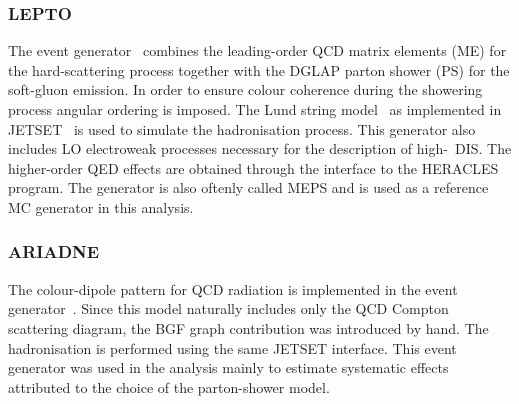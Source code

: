 \subsubsection{LEPTO}
The \lepto event generator~\cite{lepto} combines the leading-order QCD matrix elements (ME) for the hard-scattering process together with the DGLAP parton shower (PS) for the soft-gluon emission. In order to ensure colour coherence during the showering process angular ordering is imposed. The Lund string model~\cite{lund} as implemented in JETSET~\cite{jetset} is used to simulate the hadronisation process. This generator also includes LO electroweak processes necessary for the description of high-\qsq~DIS. The higher-order QED effects are obtained through the interface to the HERACLES~\cite{heracles} program. The \lepto generator is also oftenly called MEPS and is used as a reference MC generator in this analysis.
\subsubsection{ARIADNE}
The colour-dipole pattern for QCD radiation is implemented in the \ariadne event generator~\cite{ariadne}. Since this model naturally includes only the QCD Compton scattering diagram, the BGF graph contribution was introduced by hand. The hadronisation is performed using the same JETSET interface. This event generator was used in the analysis mainly to estimate systematic effects attributed to the choice of the parton-shower model.
